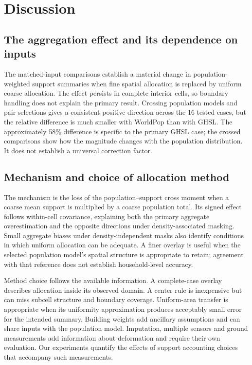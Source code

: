 \documentclass[pdflatex,sn-nature]{sn-jnl}
\begin{document}
\FloatBarrier
\section{Discussion}
\subsection{The aggregation effect and its dependence on inputs}
The matched-input comparisons establish a material change in population-weighted support summaries when fine spatial allocation is replaced by uniform coarse allocation. The effect persists in complete interior cells, so boundary handling does not explain the primary result. Crossing population models and pair selections gives a consistent positive direction across the 16 tested cases, but the relative difference is much smaller with WorldPop than with GHSL. The approximately 58\% difference is specific to the primary GHSL case; the crossed comparisons show how the magnitude changes with the population distribution. It does not establish a universal correction factor.

\subsection{Mechanism and choice of allocation method}
The mechanism is the loss of the population--support cross moment when a coarse mean support is multiplied by a coarse population total. Its signed effect follows within-cell covariance, explaining both the primary aggregate overestimation and the opposite directions under density-associated masking. Small aggregate biases under density-independent masks also identify conditions in which uniform allocation can be adequate. A finer overlay is useful when the selected population model's spatial structure is appropriate to retain; agreement with that reference does not establish household-level accuracy.

Method choice follows the available information. A complete-case overlay describes allocation inside its observed domain. A center rule is inexpensive but can miss subcell structure and boundary coverage. Uniform-area transfer is appropriate when its uniformity approximation produces acceptably small error for the intended summary. Building weights add ancillary assumptions and can share inputs with the population model. Imputation, multiple sensors and ground measurements add information about deformation and require their own evaluation. Our experiments quantify the effects of support accounting choices that accompany such measurements.
\end{document}
